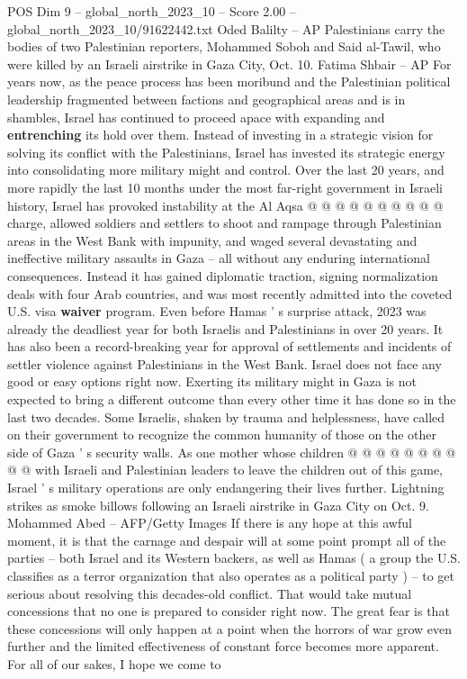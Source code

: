 \begin{textsample}{POS Dim 9 – global\_north\_2023\_10 – Score 2.00 – global\_north\_2023\_10/91622442.txt}
Oded Balilty -- AP Palestinians carry the bodies of two Palestinian reporters, Mohammed Soboh and Said al-Tawil, who were killed by an Israeli airstrike in Gaza City, Oct. 10.
Fatima Shbair -- AP For years now, as the peace process has been moribund and the Palestinian political leadership fragmented between factions and geographical areas and is in shambles, Israel has continued to proceed apace with expanding and \textbf{entrenching} its hold over them.
Instead of investing in a strategic vision for solving its conflict with the Palestinians, Israel has invested its strategic energy into consolidating more military might and control.
Over the last 20 years, and more rapidly the last 10 months under the most far-right government in Israeli history, Israel has provoked instability at the Al Aqsa @ @ @ @ @ @ @ @ @ @ charge, allowed soldiers and settlers to shoot and rampage through Palestinian areas in the West Bank with impunity, and waged several devastating and ineffective military assaults in Gaza -- all without any enduring international consequences.
Instead it has gained diplomatic traction, signing normalization deals with four Arab countries, and was most recently admitted into the coveted U.S. visa \textbf{waiver} program.
Even before Hamas ' s surprise attack, 2023 was already the deadliest year for both Israelis and Palestinians in over 20 years.
It has also been a record-breaking year for approval of settlements and incidents of settler violence against Palestinians in the West Bank.
Israel does not face any good or easy options right now.
Exerting its military might in Gaza is not expected to bring a different outcome than every other time it has done so in the last two decades.
Some Israelis, shaken by trauma and helplessness, have called on their government to recognize the common humanity of those on the other side of Gaza ' s security walls.
As one mother whose children @ @ @ @ @ @ @ @ @ @ with Israeli and Palestinian leaders to leave the children out of this game, Israel ' s military operations are only endangering their lives further.
Lightning strikes as smoke billows following an Israeli airstrike in Gaza City on Oct. 9.
Mohammed Abed -- AFP/Getty Images If there is any hope at this awful moment, it is that the carnage and despair will at some point prompt all of the parties -- both Israel and its Western backers, as well as Hamas ( a group the U.S. classifies as a terror organization that also operates as a political party ) -- to get serious about resolving this decades-old conflict.
That would take mutual concessions that no one is prepared to consider right now.
The great fear is that these concessions will only happen at a point when the horrors of war grow even further and the limited effectiveness of constant force becomes more apparent.
For all of our sakes, I hope we come to

\end{textsample}

